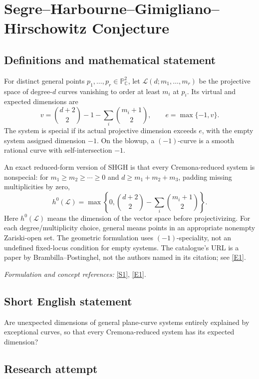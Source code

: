 \documentclass[11pt]{article}
\begin{document}
\section*{\texorpdfstring{Segre–Harbourne–Gimigliano–Hirschowitz Conjecture}{Segre–Harbourne–Gimigliano–Hirschowitz Conjecture}}\label{493}
\subsection{Definitions and mathematical statement}
For distinct general points $p_1,\ldots,p_r\in{\mathbb{P}}^2_{{\mathbb{C}}}$, let $\mathcal L(d;m_1,\ldots,m_r)$ be the projective space of degree-$d$ curves vanishing to order at least $m_i$ at $p_i$. Its virtual and expected dimensions are
\[
 v=\binom{d+2}{2}-1-\sum_i\binom{m_i+1}{2},
 \qquad e=\max\{-1,v\}.
\]
The system is special if its actual projective dimension exceeds $e$, with the empty system assigned dimension $-1$. On the blowup, a $(-1)$-curve is a smooth rational curve with self-intersection $-1$.

An exact reduced-form version of SHGH is that every Cremona-reduced system is nonspecial: for $m_1\ge m_2\ge\cdots\ge0$ and $d\ge m_1+m_2+m_3$, padding missing multiplicities by zero,
\[
 h^0(\mathcal L)=\max\left\{0,\binom{d+2}{2}
                                  -\sum_i\binom{m_i+1}{2}\right\}.
\]
Here $h^0(\mathcal L)$ means the dimension of the vector space before projectivizing. For each degree/multiplicity choice, general means points in an appropriate nonempty Zariski-open set. The geometric formulation uses $(-1)$-speciality, not an undefined fixed-locus condition for empty systems. The catalogue's URL is a paper by Brambilla--Postinghel, not the authors named in its citation; see \href{https://link.springer.com/article/10.1007/s40574-025-00468-5}{[E1]}.
\par\smallskip\textit{Formulation and concept references:} \href{https://link.springer.com/article/10.1007/s40574-025-00468-5}{[S1]}, \href{https://link.springer.com/article/10.1007/s40574-025-00468-5}{[E1]}.

\subsection{Short English statement}
Are unexpected dimensions of general plane-curve systems entirely explained by exceptional curves, so that every Cremona-reduced system has its expected dimension?
\subsection{Research attempt}
\end{document}
